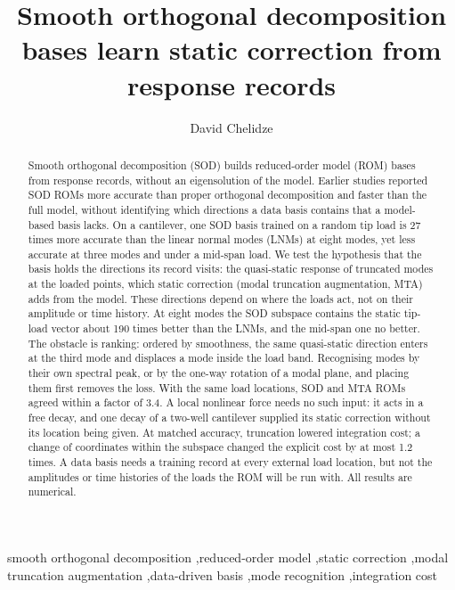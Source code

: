 \documentclass[preprint,12pt]{elsarticle}
\begin{document}
\begin{frontmatter}
\title{Smooth orthogonal decomposition bases learn static correction from response records}
\author[nld]{David Chelidze}

\begin{abstract}
Smooth orthogonal decomposition (SOD) builds reduced-order model (ROM) bases from response records, without an eigensolution of the model. Earlier studies reported SOD ROMs more accurate than proper orthogonal decomposition and faster than the full model, without identifying which directions a data basis contains that a model-based basis lacks.
On a cantilever, one SOD basis trained on a random tip load is 27 times more accurate than the linear normal modes (LNMs) at eight modes, yet less accurate at three modes and under a mid-span load.
We test the hypothesis that the basis holds the directions its record visits: the quasi-static response of truncated modes at the loaded points, which static correction (modal truncation augmentation, MTA) adds from the model. These directions depend on where the loads act, not on their amplitude or time history.
At eight modes the SOD subspace contains the static tip-load vector about 190 times better than the LNMs, and the mid-span one no better.
The obstacle is ranking: ordered by smoothness, the same quasi-static direction enters at the third mode and displaces a mode inside the load band.
Recognising modes by their own spectral peak, or by the one-way rotation of a modal plane, and placing them first removes the loss.
With the same load locations, SOD and MTA ROMs agreed within a factor of 3.4.
A local nonlinear force needs no such input: it acts in a free decay, and one decay of a two-well cantilever supplied its static correction without its location being given.
At matched accuracy, truncation lowered integration cost; a change of coordinates within the subspace changed the explicit cost by at most 1.2 times.
A data basis needs a training record at every external load location, but not the amplitudes or time histories of the loads the ROM will be run with. All results are numerical.
\end{abstract}

\begin{keyword}
smooth orthogonal decomposition \sep reduced-order model \sep static correction \sep modal truncation augmentation \sep data-driven basis \sep mode recognition \sep integration cost
\end{keyword}
\end{frontmatter}
\end{document}

